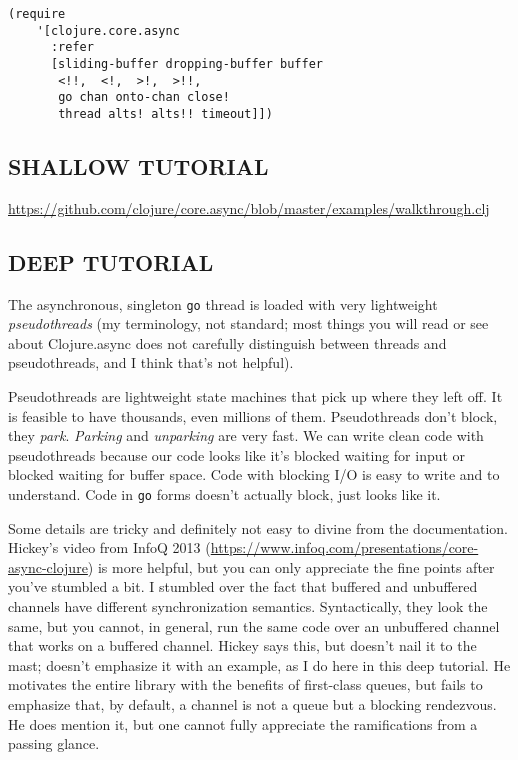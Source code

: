 \documentclass[10pt,oneside,x11names]{article}
\begin{document}
\begin{verbatim}
(require
    '[clojure.core.async
      :refer
      [sliding-buffer dropping-buffer buffer
       <!!,  <!,  >!,  >!!,
       go chan onto-chan close!
       thread alts! alts!! timeout]])
\end{verbatim}

\subsection{SHALLOW TUTORIAL}
\label{shallow-tutorial}
\url{https://github.com/clojure/core.async/blob/master/examples/walkthrough.clj}

\subsection{DEEP TUTORIAL}
\label{deep-tutorial}
The asynchronous, singleton \texttt{go} thread is loaded with very lightweight
\emph{pseudothreads} (my terminology, not standard; most things you will read
or see about Clojure.async does not carefully distinguish between
threads and pseudothreads, and I think that's not helpful).

Pseudothreads are lightweight state machines that pick up where they
left off. It is feasible to have thousands, even millions of them.
Pseudothreads don't block, they \emph{park}. \emph{Parking} and \emph{unparking} are
very fast. We can write clean code with pseudothreads because our code
looks like it's blocked waiting for input or blocked waiting for buffer
space. Code with blocking I/O is easy to write and to understand. Code
in \texttt{go} forms doesn't actually block, just looks like it.

Some details are tricky and definitely not easy to divine from the
documentation. Hickey's video from InfoQ 2013
(\url{https://www.infoq.com/presentations/core-async-clojure}) is more
helpful, but you can only appreciate the fine points after you've
stumbled a bit. I stumbled over the fact that buffered and unbuffered
channels have different synchronization semantics. Syntactically, they
look the same, but you cannot, in general, run the same code over an
unbuffered channel that works on a buffered channel. Hickey says this,
but doesn't nail it to the mast; doesn't emphasize it with an example,
as I do here in this deep tutorial. He motivates the entire library with
the benefits of first-class queues, but fails to emphasize that, by
default, a channel is not a queue but a blocking rendezvous. He does
mention it, but one cannot fully appreciate the ramifications from a
passing glance.
\end{document}
